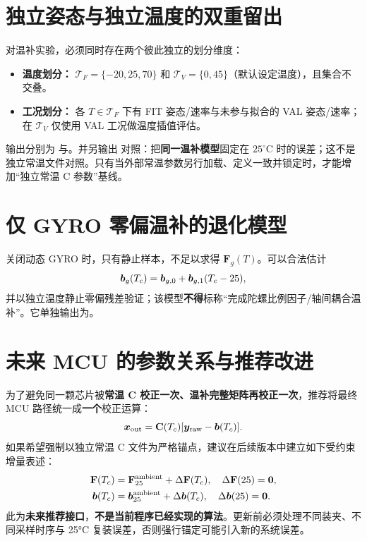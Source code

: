 \section{独立姿态与独立温度的双重留出}
对温补实验，必须同时存在两个彼此独立的划分维度：
\begin{itemize}
\item \textbf{温度划分：} $\mathcal T_F=\{-20,25,70\}$ 和 $\mathcal T_V=\{0,45\}$（默认设定温度），且集合不交叠。
\item \textbf{工况划分：} 各 $T\in\mathcal T_F$ 下有 FIT 姿态/速率与未参与拟合的 VAL 姿态/速率；在 $\mathcal T_V$ 仅使用 VAL 工况做温度插值评估。
\end{itemize}
输出分别为 与。并另输出 对照：把\textbf{同一温补模型}固定在 $25^\circ\mathrm C$ 时的误差；这不是独立常温文件对照。只有当外部常温参数另行加载、定义一致并锁定时，才能增加“独立常温 C 参数”基线。

\section{仅 GYRO 零偏温补的退化模型}
关闭动态 GYRO 时，只有静止样本，不足以求得 $\mathbf F_g(T)$。可以合法估计
\begin{equation}
\bm{b}_g(T_c)=\bm{b}_{g,0}+\bm{b}_{g,1}(T_c-25),
\end{equation}
并以独立温度静止零偏残差验证；该模型\textbf{不得}标称“完成陀螺比例因子/轴间耦合温补”。它单独输出为。

\section{未来 MCU 的参数关系与推荐改进}
为了避免同一颗芯片被\textbf{常温 C 校正一次、温补完整矩阵再校正一次}，推荐将最终 MCU 路径统一成\textbf{一个}校正运算：
\begin{equation}
\bm{x}_{\mathrm{out}}=\mathbf C(T_c)[\bm{y}_{\mathrm{raw}}-\bm{b}(T_c)].
\end{equation}
如果希望强制以独立常温 C 文件为严格锚点，建议在后续版本中建立如下受约束增量表述：
\begin{align}
\mathbf F(T_c)&=\mathbf F_{25}^{\mathrm{ambient}}+\Delta\mathbf F(T_c),\quad \Delta\mathbf F(25)=\mathbf0,\\
\bm{b}(T_c)&=\bm{b}_{25}^{\mathrm{ambient}}+\Delta\bm{b}(T_c),\quad \Delta\bm{b}(25)=\bm{0}.
\end{align}
此为\textbf{未来推荐接口}，\textbf{不是当前程序已经实现的算法}。更新前必须处理不同装夹、不同采样时序与 25°C 复装误差，否则强行锚定可能引入新的系统误差。
